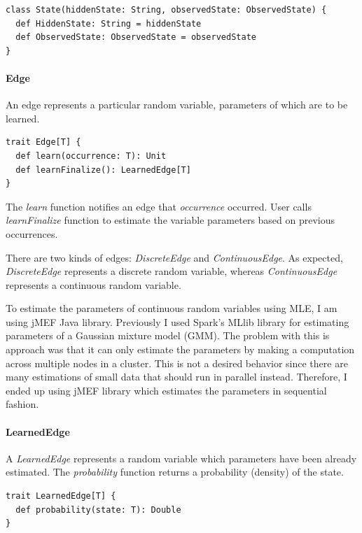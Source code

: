 \documentclass[thesis=B,english]{FITthesis}[2012/06/26]
\begin{document}
\begin{lstlisting}[style=myScalaStyle]
class State(hiddenState: String, observedState: ObservedState) {
  def HiddenState: String = hiddenState
  def ObservedState: ObservedState = observedState
}
\end{lstlisting}

\paragraph{Edge}

An edge represents a particular random variable, parameters of which are to be learned.

\begin{lstlisting}[style=myScalaStyle]
trait Edge[T] {
  def learn(occurrence: T): Unit
  def learnFinalize(): LearnedEdge[T]
}
\end{lstlisting}

The \textit{learn} function notifies an edge that \textit{occurrence} occurred. User calls \textit{learnFinalize} function to estimate the variable parameters based on previous occurrences.

There are two kinds of edges: \textit{DiscreteEdge} and \textit{ContinuousEdge}. As expected, \textit{DiscreteEdge} represents a discrete random variable, whereas \textit{ContinuousEdge} represents a continuous random variable.

To estimate the parameters of continuous random variables using MLE, I am using jMEF Java library. Previously I used Spark's MLlib library for estimating parameters of a Gaussian mixture model (GMM). The problem with this is approach was that it can only estimate the parameters by making a computation across multiple nodes in a cluster. This is not a desired behavior since there are many estimations of small data that should run in parallel instead. Therefore, I ended up using jMEF library which estimates the parameters in sequential fashion.

\paragraph{LearnedEdge}

A \textit{LearnedEdge} represents a random variable which parameters have been already estimated. The \textit{probability} function returns a probability (density) of the state.

\begin{lstlisting}[style=myScalaStyle]
trait LearnedEdge[T] {
  def probability(state: T): Double
}
\end{lstlisting}
\end{document}
